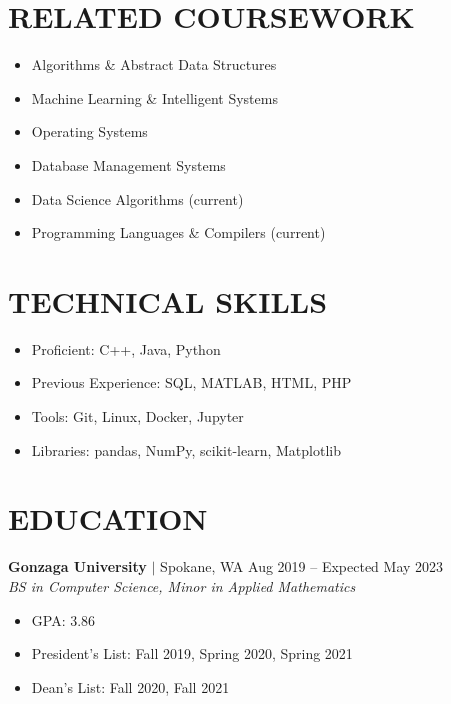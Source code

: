 \documentclass[11pt, a4paper, roman]{moderncv}
\newcommand{\education}[5]{
	\textbf{#1} $|$ #2
	\hfill#3
	\\\textit{#4}
	#5
	\vspace{2mm}
}
\begin{document}
\maketitle
\vspace*{-12mm}

\begin{multicols}{2}

\section{RELATED COURSEWORK}
{\begin{itemize}
    \item Algorithms \& Abstract Data Structures
    \item Machine Learning \& Intelligent Systems
    \item Operating Systems
    \item Database Management Systems
    \item Data Science Algorithms (current)
    \item Programming Languages \& Compilers (current)
  \end{itemize}
} 

\columnbreak  


\section{TECHNICAL SKILLS}
{\begin{itemize}
    \item Proficient: C++, Java, Python
    \item Previous Experience: SQL, MATLAB, HTML, PHP
    \item Tools: Git, Linux, Docker, Jupyter
    \item Libraries: pandas, NumPy, scikit-learn, Matplotlib
  \end{itemize}
}
\end{multicols}
\vspace*{-2mm}
\section{EDUCATION}

\education{Gonzaga University}{Spokane, WA}{Aug 2019 -- Expected May 2023}{BS in Computer Science, Minor in Applied Mathematics}
	{\begin{itemize}
    		\item GPA: 3.86
    		\item President's List: Fall 2019, Spring 2020, Spring 2021
    		\item Dean's List: Fall 2020, Fall 2021
  		\end{itemize}
}
\end{document}
